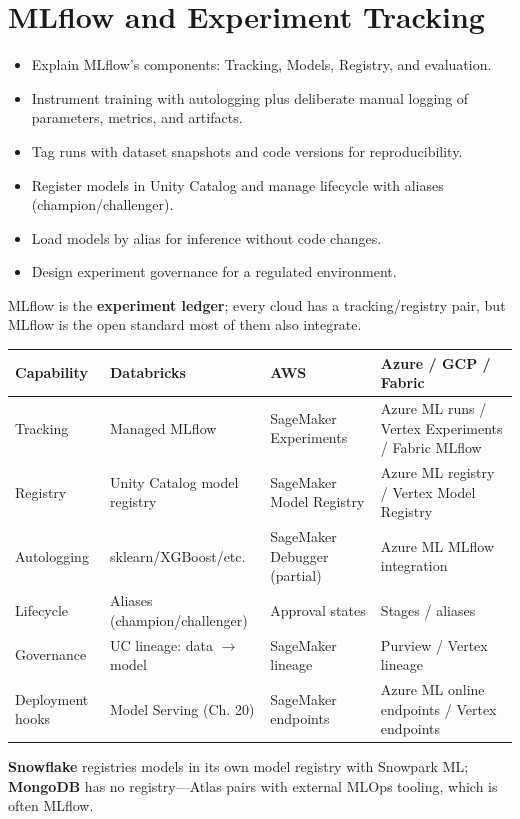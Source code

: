 \chapter{MLflow and Experiment Tracking}
%
%
\begin{objectives}
\begin{itemize}
    \item Explain MLflow's components: Tracking, Models, Registry, and evaluation.
    \item Instrument training with autologging plus deliberate manual logging of parameters, metrics, and artifacts.
    \item Tag runs with dataset snapshots and code versions for reproducibility.
    \item Register models in Unity Catalog and manage lifecycle with aliases (champion/challenger).
    \item Load models by alias for inference without code changes.
    \item Design experiment governance for a regulated environment.
\end{itemize}
\end{objectives}

\begin{crosscloud}
MLflow is the \textbf{experiment ledger}; every cloud has a tracking/registry pair, but MLflow is
the open standard most of them also integrate.

\vspace{2mm}
{\footnotesize
\begin{tabular}{@{}p{3.0cm}p{3.4cm}p{3.2cm}p{3.2cm}@{}}
\toprule
\textbf{Capability} & \textbf{Databricks} & \textbf{AWS} & \textbf{Azure / GCP / Fabric} \\
\midrule
Tracking & Managed MLflow & SageMaker Experiments & Azure ML runs / Vertex Experiments / Fabric MLflow \\
Registry & Unity Catalog model registry & SageMaker Model Registry & Azure ML registry / Vertex Model Registry \\
Autologging & sklearn/XGBoost/etc. & SageMaker Debugger (partial) & Azure ML MLflow integration \\
Lifecycle & Aliases (champion/challenger) & Approval states & Stages / aliases \\
Governance & UC lineage: data $\rightarrow$ model & SageMaker lineage & Purview / Vertex lineage \\
Deployment hooks & Model Serving (Ch. 20) & SageMaker endpoints & Azure ML online endpoints / Vertex endpoints \\
\bottomrule
\end{tabular}}

\vspace{1mm}
\textbf{Snowflake} registries models in its own model registry with Snowpark ML; \textbf{MongoDB}
has no registry---Atlas pairs with external MLOps tooling, which is often MLflow.
\end{crosscloud}

